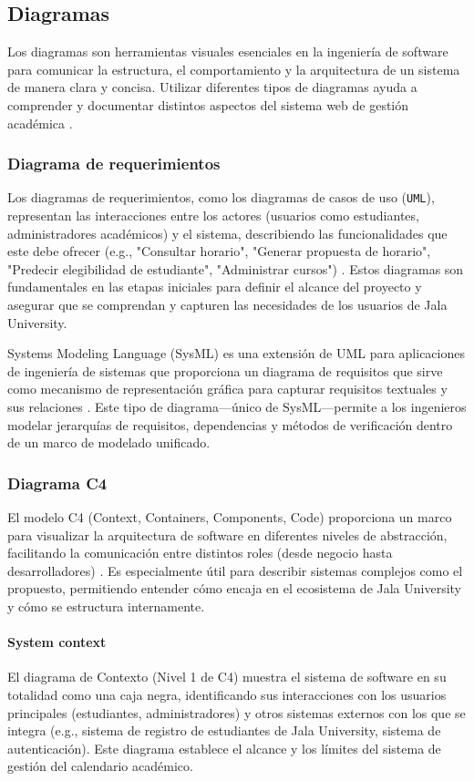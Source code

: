 \subsection{Diagramas}
Los diagramas son herramientas visuales esenciales en la ingeniería de software para comunicar la estructura, el comportamiento y la arquitectura de un sistema de manera clara y concisa.
Utilizar diferentes tipos de diagramas ayuda a comprender y documentar distintos aspectos del sistema web de gestión académica \parencite{Fowler2003}.

\subsubsection{Diagrama de requerimientos}
Los diagramas de requerimientos, como los diagramas de casos de uso (\texttt{UML}), representan las interacciones entre los actores (usuarios como estudiantes, administradores académicos) y el sistema, describiendo las funcionalidades que este debe ofrecer (e.g., "Consultar horario", "Generar propuesta de horario", "Predecir elegibilidad de estudiante", "Administrar cursos") \parencite{Jacobson1992}.
Estos diagramas son fundamentales en las etapas iniciales para definir el alcance del proyecto y asegurar que se comprendan y capturen las necesidades de los usuarios de Jala University.

Systems Modeling Language (SysML) es una extensión de UML para aplicaciones de ingeniería de sistemas que proporciona un diagrama de requisitos que sirve como mecanismo de representación gráfica para capturar requisitos textuales y sus relaciones \parencite{Friedenthal2014}.
Este tipo de diagrama—único de SysML—permite a los ingenieros modelar jerarquías de requisitos, dependencias y métodos de verificación dentro de un marco de modelado unificado.

\subsubsection{Diagrama C4}
El modelo C4 (Context, Containers, Components, Code) proporciona un marco para visualizar la arquitectura de software en diferentes niveles de abstracción, facilitando la comunicación entre distintos roles (desde negocio hasta desarrolladores) \parencite{BrownC4}.
Es especialmente útil para describir sistemas complejos como el propuesto, permitiendo entender cómo encaja en el ecosistema de Jala University y cómo se estructura internamente.

\paragraph{System context}
El diagrama de Contexto (Nivel 1 de C4) muestra el sistema de software en su totalidad como una caja negra, identificando sus interacciones con los usuarios principales (estudiantes, administradores) y otros sistemas externos con los que se integra (e.g., sistema de registro de estudiantes de Jala University, sistema de autenticación).
Este diagrama establece el alcance y los límites del sistema de gestión del calendario académico.

